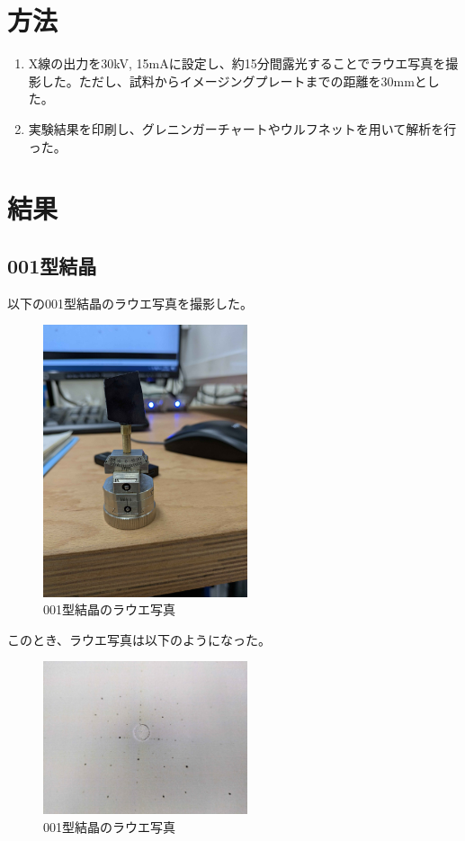 \documentclass[a4paper,11pt]{jsarticle}
\begin{document}
\section{方法}
\begin{enumerate}
  \item X線の出力を30kV, 15mAに設定し、約15分間露光することでラウエ写真を撮影した。ただし、試料からイメージングプレートまでの距離を30mmとした。
  \item 実験結果を印刷し、グレニンガーチャートやウルフネットを用いて解析を行った。
\end{enumerate}

\section{結果}
\subsection{001型結晶}
以下の001型結晶のラウエ写真を撮影した。
\begin{figure}[H]
  \centering
  \includegraphics[width=6cm]{mae.jpg}
  \caption{001型結晶のラウエ写真}
\end{figure}

このとき、ラウエ写真は以下のようになった。
\begin{figure}[H]
  \centering
  \includegraphics[width=6cm]{001.jpg}
  \caption{001型結晶のラウエ写真}
\end{figure}
\end{document}
